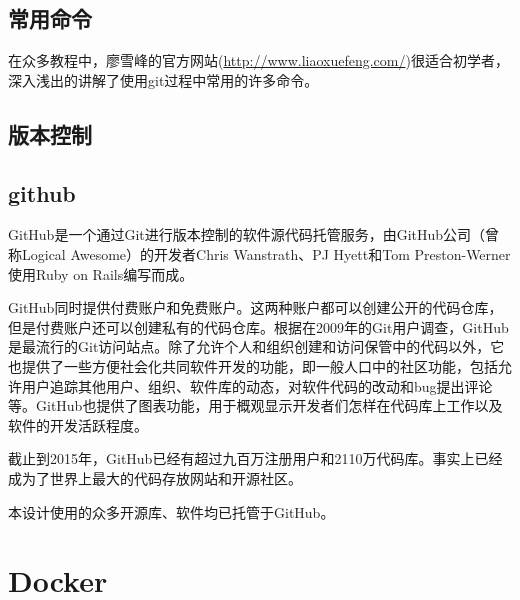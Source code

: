 		\subsection{常用命令}
			\par 在众多教程中，廖雪峰的官方网站(\href{http://www.liaoxuefeng.com/}{http://www.liaoxuefeng.com/})很适合初学者，深入浅出的讲解了使用git过程中常用的许多命令。
		\subsection{版本控制}
		\subsection{github}
			\par GitHub是一个通过Git进行版本控制的软件源代码托管服务，由GitHub公司（曾称Logical Awesome）的开发者Chris Wanstrath、PJ Hyett和Tom Preston-Werner使用Ruby on Rails编写而成。
			\par GitHub同时提供付费账户和免费账户。这两种账户都可以创建公开的代码仓库，但是付费账户还可以创建私有的代码仓库。根据在2009年的Git用户调查，GitHub是最流行的Git访问站点。除了允许个人和组织创建和访问保管中的代码以外，它也提供了一些方便社会化共同软件开发的功能，即一般人口中的社区功能，包括允许用户追踪其他用户、组织、软件库的动态，对软件代码的改动和bug提出评论等。GitHub也提供了图表功能，用于概观显示开发者们怎样在代码库上工作以及软件的开发活跃程度。
			\par 截止到2015年，GitHub已经有超过九百万注册用户和2110万代码库。事实上已经成为了世界上最大的代码存放网站和开源社区。\cite{ wiki:GitHub}
			\par 本设计使用的众多开源库、软件均已托管于GitHub。
	\section{Docker}
